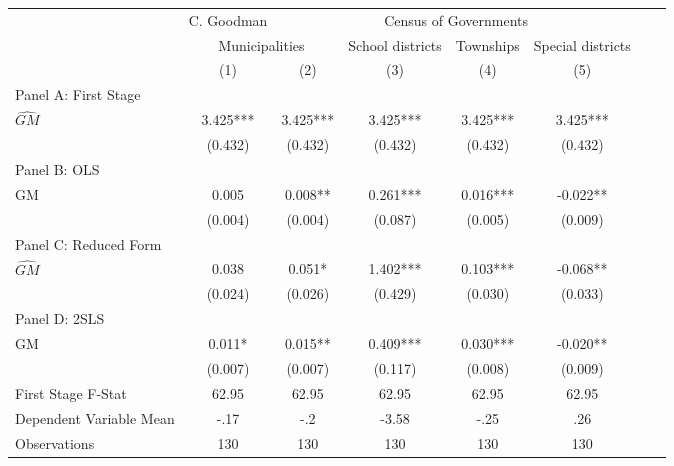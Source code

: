 \begin{tabular}{l*{7}{c}} \toprule
&\multicolumn{1}{c}{C. Goodman}&\multicolumn{4}{c}{Census of Governments}\\\cmidrule(lr){2-2}\cmidrule(lr){3-6}
&\multicolumn{2}{c}{Municipalities}&\multicolumn{1}{c}{School districts}&\multicolumn{1}{c}{Townships}&\multicolumn{1}{c}{Special districts}\\\cmidrule(lr){2-3}\cmidrule(lr){4-6}
&\multicolumn{1}{c}{(1)}&\multicolumn{1}{c}{(2)}&\multicolumn{1}{c}{(3)}&\multicolumn{1}{c}{(4)}&\multicolumn{1}{c}{(5)}\\
\cmidrule(lr){1-6}
\multicolumn{5}{l}{Panel A: First Stage}\\
\cmidrule(lr){1-6}
$\widehat{GM}$  &    3.425***&    3.425***&    3.425***&    3.425***&    3.425***\\
                &  (0.432)   &  (0.432)   &  (0.432)   &  (0.432)   &  (0.432)   \\
\cmidrule(lr){1-6}
\multicolumn{5}{l}{Panel B: OLS}\\
\cmidrule(lr){1-6}
GM              &    0.005   &    0.008** &    0.261***&    0.016***&   -0.022** \\
                &  (0.004)   &  (0.004)   &  (0.087)   &  (0.005)   &  (0.009)   \\
\cmidrule(lr){1-6}
\multicolumn{5}{l}{Panel C: Reduced Form}\\
\cmidrule(lr){1-6}
$\widehat{GM}$  &    0.038   &    0.051*  &    1.402***&    0.103***&   -0.068** \\
                &  (0.024)   &  (0.026)   &  (0.429)   &  (0.030)   &  (0.033)   \\
\cmidrule(lr){1-6}
\multicolumn{5}{l}{Panel D: 2SLS}\\
\cmidrule(lr){1-6}
GM              &    0.011*  &    0.015** &    0.409***&    0.030***&   -0.020** \\
                &  (0.007)   &  (0.007)   &  (0.117)   &  (0.008)   &  (0.009)   \\
\midrule
First Stage F-Stat&    62.95   &    62.95   &    62.95   &    62.95   &    62.95   \\
Dependent Variable Mean&     -.17   &      -.2   &    -3.58   &     -.25   &      .26   \\
Observations    &      130   &      130   &      130   &      130   &      130   \\
 \bottomrule \end{tabular}
